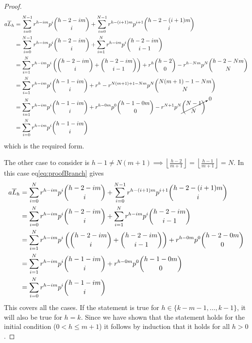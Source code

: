 \begin{proof}
\begin{align*}
	a\overline{L}_h &= \sum_{i=0}^{N-1} r^{h-im}p^{i}{h-2-im \choose i} +
         \sum_{i=0}^{N-1} r^{h-(i+1)m}p^{i+1}{h-2-(i+1)m \choose i}\\
         &= \sum_{i=0}^{N-1} r^{h-im}p^{i}{h-2-im \choose i} +
         \sum_{i=1}^{N} r^{h-im}p^{i}{h-2-im \choose i-1} \\
         &= \sum_{i=1}^{N} r^{h-im}p^{i}\left({h-2-im \choose i} + {h-2-im \choose i-1}\right)
         + r^{h}{h-2 \choose 0} - r^{h-Nm}p^{N}{h-2-Nm \choose N}\\
         &= \sum_{i=1}^{N} r^{h-im}p^{i}{h-1-im \choose i} + r^h -
         r^{N(m+1)+1-Nm}p^{N}{N(m+1)-1-Nm \choose N}\\
         &= \sum_{i=1}^{N} r^{h-im}p^{i}{h-1-im \choose i} + r^{h-0m}p^0{h-1-0m \choose 0} -
         r^{N+1}p^{N}\cancelto{0}{{N-1 \choose N}}\\
         &= \sum_{i=0}^{N} r^{h-im}p^{i}{h-1-im \choose i}
\end{align*}
which is the required form.

\noindent The other case to consider is $h-1 \neq N(m+1) \implies \left\lfloor{\frac{h-2}{m+1}}\right\rfloor = \left\lfloor{\frac{h-1}{m+1}}\right\rfloor = N$. In this case eq\ref{eq:proofBranch} gives
\begin{align*}
    a\overline{L}_h &= \sum_{i=0}^{N} r^{h-im}p^{i}{h-2-im \choose i} +
          \sum_{i=0}^{N-1} r^{h-(i+1)m}p^{i+1}{h-2-(i+1)m \choose i}\\
          &= \sum_{i=0}^{N} r^{h-im}p^{i}{h-2-im \choose i} +
          \sum_{i=1}^{N} r^{h-im}p^{i}{h-2-im \choose i-1}\\
          &= \sum_{i=1}^{N} r^{h-im}p^{i}\left({h-2-im \choose i} +
          {h-2-im \choose i-1}\right) + r^{h-0m}p^{0}{h-2-0m \choose 0}\\
          &= \sum_{i=1}^{N} r^{h-im}p^{i}{h-1-im \choose i} + r^{h-0m}p^{0}{h-1-0m \choose 0}\\
          &= \sum_{i=0}^{N} r^{h-im}p^{i}{h-1-im \choose i}
\end{align*}
This covers all the cases. If the statement is true for $h \in \{k-m-1,\ldots,k-1\}$, it will also be true for $h = k$. Since we have shown that the statement holds for the initial condition ($0 < h \leq m+1$) it follows by induction that it holds for all $h > 0$.
\end{proof}


